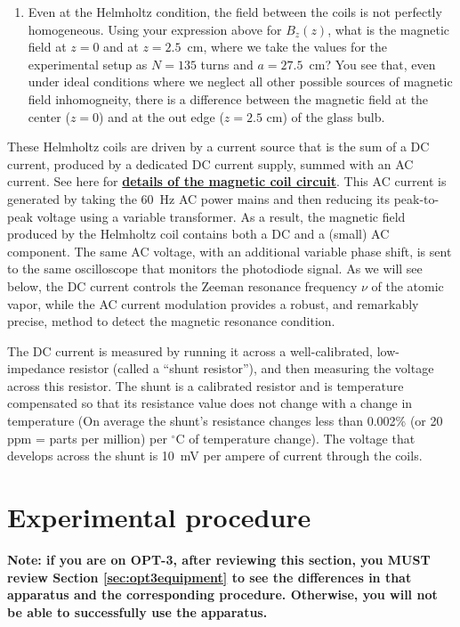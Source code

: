 \documentclass{../lab}
\newcommand{\CircuitForMagneticCoils}{https://berkeley-physics111b.github.io/assets/pdf/oldwebsitestructure/OPT/Circuitformagnetic\%20coils.png}
\begin{document}
\begin{itemize}
\begin{enumerate}[resume=forstudents, label=Q\arabic*.]
    \item{} Even at the Helmholtz condition, the field between the coils is not perfectly homogeneous.  Using your expression above for $B_z(z)$, what is the magnetic field at $z=0$ and at $z = 2.5$~cm, where we take the values for the experimental setup as $N=135$ turns and $a = 27.5$~cm?  You see that, even under ideal conditions where we neglect all other possible sources of magnetic field inhomogneity, there is a difference between the magnetic field at the center ($z=0$) and at the out edge ($z=2.5$ cm) of the glass bulb.
\end{enumerate}

    These Helmholtz coils are driven by a current source that is the sum of a DC current, produced by a dedicated DC current supply, summed with an AC current.  See here for  \href{\CircuitForMagneticCoils}{\textbf{details of the magnetic coil circuit}}.  This AC current is generated by taking the 60~Hz AC power mains and then reducing its peak-to-peak voltage using a variable transformer.  As a result, the magnetic field produced by the Helmholtz coil contains both a DC and a (small) AC component.  The same AC voltage, with an additional variable phase shift, is sent to the same oscilloscope that monitors the photodiode signal.  As we will see below, the DC current controls the Zeeman resonance frequency $\nu$ of the atomic vapor, while the AC current modulation provides a robust, and remarkably precise, method to detect the magnetic resonance condition.
    
    The DC current is measured by running it across a well-calibrated, low-impedance resistor (called a ``shunt resistor''), and then measuring the voltage across this resistor.   The shunt is a calibrated resistor and is temperature compensated so that its resistance value does not change with a change in temperature (On average the shunt's resistance changes less than 0.002\% (or 20 ppm = parts per million) per $^\circ$C of temperature change). The voltage that develops across the shunt is 10~mV per ampere of current through the coils. 
    
\end{itemize}


\section{Experimental procedure}

\textbf{Note: if you are on OPT-3, after reviewing this section, you MUST review Section \ref{sec:opt3equipment} to see the differences in that apparatus and the corresponding procedure. Otherwise, you will not be able to successfully use the apparatus.} 
\end{document}
